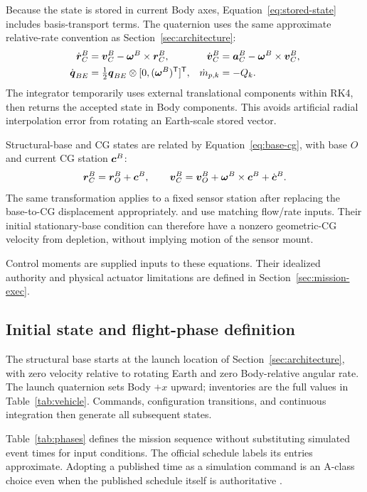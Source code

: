 Because the state is stored in current Body axes, Equation~\eqref{eq:stored-state} includes basis-transport terms. The quaternion uses the same approximate relative-rate convention as Section~\ref{sec:architecture}:
\begin{equation}
\begin{aligned}
 \dot{\boldsymbol{r}}_C^B&=\boldsymbol{v}_C^B-\boldsymbol{\omega}^B\times\boldsymbol{r}_C^B,&
 \dot{\boldsymbol{v}}_C^B&=\boldsymbol{a}_C^B-\boldsymbol{\omega}^B\times\boldsymbol{v}_C^B,\\
 \dot{\boldsymbol{q}}_{BE}&=\tfrac12\boldsymbol{q}_{BE}\otimes[0,(\boldsymbol{\omega}^B)^{\mathsf T}]^{\mathsf T},&
 \dot m_{p,k}&=-Q_k.
\end{aligned}
\label{eq:stored-state}
\end{equation}
The integrator temporarily uses external translational components within RK4, then returns the accepted state in Body components. This avoids artificial radial interpolation error from rotating an Earth-scale stored vector.

Structural-base and CG states are related by Equation~\eqref{eq:base-cg}, with base $O$ and current CG station $\boldsymbol{c}^B$:
\begin{equation}
 \boldsymbol{r}_C^B=\boldsymbol{r}_O^B+\boldsymbol{c}^B,\qquad
 \boldsymbol{v}_C^B=\boldsymbol{v}_O^B+\boldsymbol{\omega}^B\times\boldsymbol{c}^B+\dot{\boldsymbol{c}}^B.
\label{eq:base-cg}
\end{equation}
The same transformation applies to a fixed sensor station after replacing the base-to-CG displacement appropriately.  and  use matching flow/rate inputs. Their initial stationary-base condition can therefore have a nonzero geometric-CG velocity from depletion, without implying motion of the sensor mount.

Control moments are supplied inputs to these equations. Their idealized authority and physical actuator limitations are defined in Section~\ref{sec:mission-exec}.

\subsection{Initial state and flight-phase definition}
The structural base starts at the launch location of Section~\ref{sec:architecture}, with zero velocity relative to rotating Earth and zero Body-relative angular rate. The launch quaternion sets Body $+x$ upward; inventories are the full values in Table~\ref{tab:vehicle}. Commands, configuration transitions, and continuous integration then generate all subsequent states.

Table~\ref{tab:phases} defines the mission sequence without substituting simulated event times for input conditions. The official schedule labels its entries approximate. Adopting a published time as a simulation command is an A-class choice even when the published schedule itself is authoritative \cite{nasacrs10press}.



